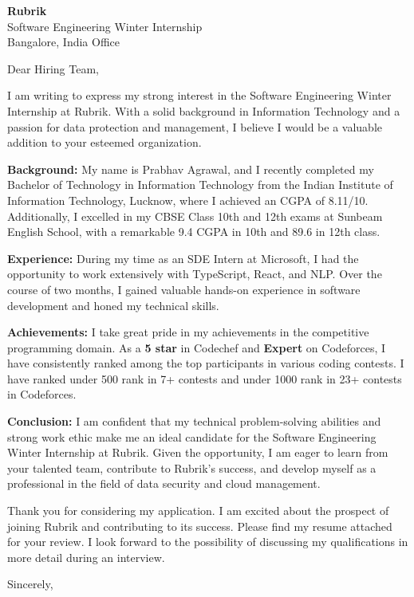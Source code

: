 \documentclass{letter}
\begin{document}
\begin{letter}{\textbf{Rubrik}\\
Software Engineering Winter Internship\\
Bangalore, India Office}

\opening{Dear Hiring Team,}

I am writing to express my strong interest in the Software Engineering Winter Internship at Rubrik. With a solid background in Information Technology and a passion for data protection and management, I believe I would be a valuable addition to your esteemed organization.

\textbf{Background:}
My name is Prabhav Agrawal, and I recently completed my Bachelor of Technology in Information Technology from the Indian Institute of Information Technology, Lucknow, where I achieved an CGPA of 8.11/10. Additionally, I excelled in my CBSE Class 10th and 12th exams at Sunbeam English School, with a remarkable 9.4 CGPA in 10th and 89.6 in 12th class.

\textbf{Experience:}
During my time as an SDE Intern at Microsoft, I had the opportunity to work extensively with TypeScript, React, and NLP. Over the course of two months, I gained valuable hands-on experience in software development and honed my technical skills.

\textbf{Achievements:}
I take great pride in my achievements in the competitive programming domain. As a \textbf{5 star} in Codechef and \textbf{Expert} on Codeforces, I have consistently ranked among the top participants in various coding contests. I have ranked under 500 rank in 7+ contests and under 1000 rank in 23+ contests in Codeforces. 

\textbf{Conclusion:}
I am confident that my technical problem-solving abilities and strong work ethic make me an ideal candidate for the Software Engineering Winter Internship at Rubrik. Given the opportunity, I am eager to learn from your talented team, contribute to Rubrik's success, and develop myself as a professional in the field of data security and cloud management.

Thank you for considering my application. I am excited about the prospect of joining Rubrik and contributing to its success. Please find my resume attached for your review. I look forward to the possibility of discussing my qualifications in more detail during an interview.

\closing{Sincerely,}


\end{letter}
\end{document}
